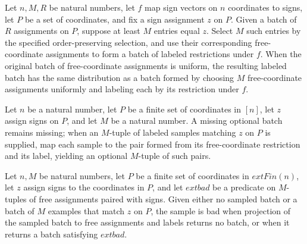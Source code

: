 \begin{theorem}
\label{FABL.map_uniformPMF_selectedJuntaRestrictionBatch}
\leanok
{}
Let $n,M,R$ be natural numbers, let $f$ map sign vectors on $n$ coordinates to signs,
let $P$ be a set of coordinates, and fix a sign assignment $z$ on $P$. Given a batch of
$R$ assignments on $P$, suppose at least $M$ entries equal $z$. Select $M$ such entries
by the specified order-preserving selection, and use their corresponding free-coordinate
assignments to form a batch of labeled restrictions under $f$. When the original batch
of free-coordinate assignments is uniform, the resulting labeled batch has the same
distribution as a batch formed by choosing $M$ free-coordinate assignments uniformly and
labeling each by its restriction under $f$.
\end{theorem}

\begin{definition}
\label{FABL.projectJuntaRestrictionBatch}
\leanok
{}
Let $n$ be a natural number, let $P$ be a finite set of coordinates in $[n]$, let $z$
assign signs on $P$, and let $M$ be a natural number. A missing optional batch remains
missing; when an $M$-tuple of labeled samples matching $z$ on $P$ is supplied, map each
sample to the pair formed from its free-coordinate restriction and its label, yielding
an optional $M$-tuple of such pairs.
\end{definition}

\begin{definition}
\label{FABL.JuntaRestrictionSampleBad}
\leanok
{}
Let $n,M$ be natural numbers, let $P$ be a finite set of coordinates in $	ext{Fin}(n)$,
let $z$ assign signs to the coordinates in $P$, and let $	ext{bad}$ be a predicate on
$M$-tuples of free assignments paired with signs. Given either no sampled batch or a
batch of $M$ examples that match $z$ on $P$, the sample is bad when projection of the
sampled batch to free assignments and labels returns no batch, or when it returns a
batch satisfying $	ext{bad}$.
\end{definition}

